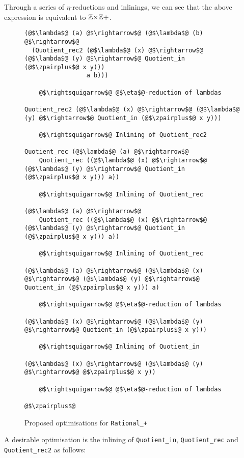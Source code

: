 \documentclass[12pt,twoside,maitrise]{dms}
\theoremstyle{definition}
\numberwithin{equation}{section}
\numberwithin{table}{chapter}
\numberwithin{figure}{chapter}
\newcommand\id[1] {\texttt{#1}}
\begin{document}
Through a series of $\eta$-reductions and inlinings, we can see that the above
expression is equivalent to $\mathbb{Z}{\times}\mathbb{Z}+$.

\begin{figure}
\begin{mdframed}
\begin{verbatim}
(@$\lambda$@ (a) @$\rightarrow$@ (@$\lambda$@ (b) @$\rightarrow$@
  (Quotient_rec2 (@$\lambda$@ (x) @$\rightarrow$@ (@$\lambda$@ (y) @$\rightarrow$@ Quotient_in (@$\zpairplus$@ x y)))
                 a b)))

    @$\rightsquigarrow$@ @$\eta$@-reduction of lambdas

Quotient_rec2 (@$\lambda$@ (x) @$\rightarrow$@ (@$\lambda$@ (y) @$\rightarrow$@ Quotient_in (@$\zpairplus$@ x y)))

    @$\rightsquigarrow$@ Inlining of Quotient_rec2

Quotient_rec (@$\lambda$@ (a) @$\rightarrow$@
    Quotient_rec ((@$\lambda$@ (x) @$\rightarrow$@ (@$\lambda$@ (y) @$\rightarrow$@ Quotient_in (@$\zpairplus$@ x y))) a))

    @$\rightsquigarrow$@ Inlining of Quotient_rec

(@$\lambda$@ (a) @$\rightarrow$@
    Quotient_rec ((@$\lambda$@ (x) @$\rightarrow$@ (@$\lambda$@ (y) @$\rightarrow$@ Quotient_in (@$\zpairplus$@ x y))) a))

    @$\rightsquigarrow$@ Inlining of Quotient_rec

(@$\lambda$@ (a) @$\rightarrow$@ (@$\lambda$@ (x) @$\rightarrow$@ (@$\lambda$@ (y) @$\rightarrow$@ Quotient_in (@$\zpairplus$@ x y))) a)

    @$\rightsquigarrow$@ @$\eta$@-reduction of lambdas

(@$\lambda$@ (x) @$\rightarrow$@ (@$\lambda$@ (y) @$\rightarrow$@ Quotient_in (@$\zpairplus$@ x y)))

    @$\rightsquigarrow$@ Inlining of Quotient_in

(@$\lambda$@ (x) @$\rightarrow$@ (@$\lambda$@ (y) @$\rightarrow$@ @$\zpairplus$@ x y))

    @$\rightsquigarrow$@ @$\eta$@-reduction of lambdas

@$\zpairplus$@
\end{verbatim}
\end{mdframed}
\caption{Proposed optimisations for \id{Rational\_+}}\label{fig:optim-rational-add}
\end{figure}

A desirable optimisation is the inlining of \id{Quotient\_in}, \id{Quotient\_rec} and
\id{Quotient\_rec2} as follows:
\end{document}
